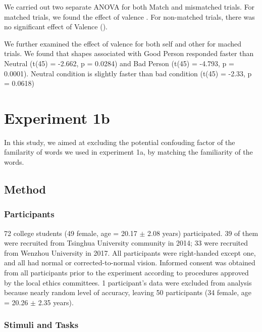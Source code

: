 \documentclass[man]{apa6}
\begin{document}
We carried out two separate ANOVA for both Match and mismatched trials. For matched trials, we found the effect of valence . For non-matched trials, there was no significant effect of Valence ().

We further examined the effect of valence for both self and other for mached trials. We found that shapes associated with Good Person responded faster than Neutral (t(45) = -2.662, p = 0.0284) and Bad Person (t(45) = -4.793, p = 0.0001). Neutral condition is slightly faster than bad condition (t(45) = -2.33, p = 0.0618)

\hypertarget{experiment-1b}{%
\section{Experiment 1b}\label{experiment-1b}}

In this study, we aimed at excluding the potential confouding factor of the familarity of words we used in experiment 1a, by matching the familiarity of the words.

\hypertarget{method}{%
\subsection{Method}\label{method}}

\hypertarget{participants-1}{%
\subsubsection{Participants}\label{participants-1}}

72 college students (49 female, age = 20.17 \(\pm\) 2.08 years) participated. 39 of them were recruited from Tsinghua University community in 2014; 33 were recruited from Wenzhou University in 2017. All participants were right-handed except one, and all had normal or corrected-to-normal vision. Informed consent was obtained from all participants prior to the experiment according to procedures approved by the local ethics committees. 1 participant's data were excluded from analysis because nearly random level of accuracy, leaving 50 participants (34 female, age = 20.26 \(\pm\) 2.35 years).

\hypertarget{stimuli-and-tasks-1}{%
\subsubsection{Stimuli and Tasks}\label{stimuli-and-tasks-1}}
\end{document}
